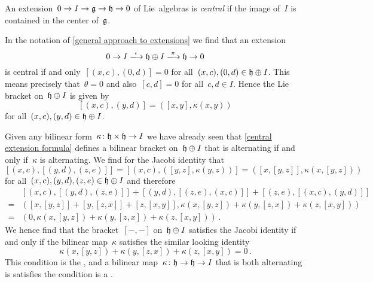 \begin{definition}
  An extension~$0 \to I \to \mathfrak{g} \to \mathfrak{h} \to 0$ of Lie~algebras is \emph{central} if the image of~$I$ is contained in the center of~$\mathfrak{g}$.
\end{definition}


\begin{example}
  In the notation of \cref{general approach to extensions} we find that an extension
  \[
    0
    \to
    I
    \xlongto{\iota}
    \hlie \oplus I
    \xlongto{\pi}
    \hlie
    \to
    0
  \]
  is central if and only~$[(x,c), (0,d)] = 0$ for all~$(x,c), (0,d) \in \mathfrak{h} \oplus I$.
  This means precisely that~$\theta = 0$ and also~$[c,d] = 0$ for all~$c, d \in I$.
  Hence the Lie bracket on~$\mathfrak{h} \oplus I$ is given by
  \begin{equation}
    \label{central extension formula}
    [ (x,c), (y,d) ]
    =
    ( [x,y], \kappa(x,y) )
  \end{equation}
  for all~$(x,c), (y,d) \in \mathfrak{h} \oplus I$.
  
  Given any bilinear form~$\kappa \colon \mathfrak{h} \times \mathfrak{h} \to I$ we have already seen that \eqref{central extension formula} defines a bilinear bracket on~$\mathfrak{h} \oplus I$ that is alternating if and only if~$\kappa$ is alternating.
  We find for the Jacobi identity that
  \[
    [ (x,c), [ (y,d), (z,e) ] ]
    =
    [ (x,c), ([y,z], \kappa(y,z)) ]
    =
    ( [x,[y,z]], \kappa(x, [y,z]) )
  \]
  for all~$(x,c), (y,d), (z,e) \in \mathfrak{h} \oplus I$ and therefore
  \begin{align*}
    {}&
      [(x,c), [(y,d), (z,e)]]
    + [(y,d), [(z,e), (x,c)]]
    + [(z,e), [(x,c), (y,d)]]
    \\
    ={}&
    (
      [x,[y,z]] + [y,[z,x]] + [z,[x,y]],
      \kappa(x, [y,z]) + \kappa(y, [z,x]) + \kappa(z, [x,y])
    )
    \\
    ={}&
    ( 0, \kappa(x, [y,z]) + \kappa(y, [z,x]) + \kappa(z, [x,y]) ) \,.
  \end{align*}
  We hence find that the bracket~$[-,-]$ on~$\mathfrak{h} \oplus I$ satisfies the Jacobi identity if and only if the bilinear map~$\kappa$ satisfies the similar looking identity
  \[
    \kappa(x, [y,z]) + \kappa(y, [z,x]) + \kappa(z, [x,y])
    =
    0 \,.
  \]
  This condition is the , and a bilinear map~$\kappa \colon \mathfrak{h} \to \mathfrak{h} \to I$ that is both alternating is satisfies the {\twococycle} condition is a {\twococycle}.
  

\end{example}
